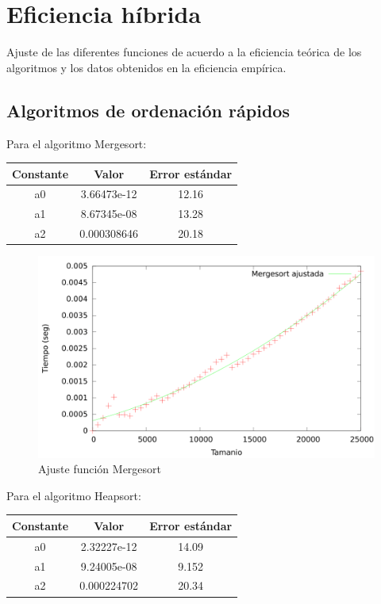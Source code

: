 \documentclass{article}
\begin{document}
	\section{Eficiencia híbrida}
	Ajuste de las diferentes funciones de acuerdo a la eficiencia teórica de los algoritmos y los datos obtenidos en la eficiencia empírica.
	
	\subsection{Algoritmos de ordenación rápidos}
	
	
	Para el algoritmo Mergesort:

	\begin{longtable}{|c|c|c|}
		\hline
	 	Constante		& Valor			& Error estándar	\\ \hline
		a0              & 3.66473e-12	& 12.16 \\ \hline
		a1              & 8.67345e-08	& 13.28 \\ \hline
		a2              & 0.000308646	& 20.18 \\ \hline
	\end{longtable}

	\begin{figure}[H]
		\centering
		\includegraphics[totalheight=8cm]{img/Mergesort_ajustada}
		\caption{Ajuste función Mergesort}
		\label{fig:Mergesort_ajustada}
	\end{figure}

	Para el algoritmo Heapsort:

	\begin{longtable}{|c|c|c|}
		\hline
		Constante		& Valor			& Error estándar	\\ \hline
		a0              & 2.32227e-12	& 14.09 \\ \hline
		a1              & 9.24005e-08	& 9.152 \\ \hline
		a2              & 0.000224702	& 20.34 \\ \hline
	\end{longtable}
\end{document}

